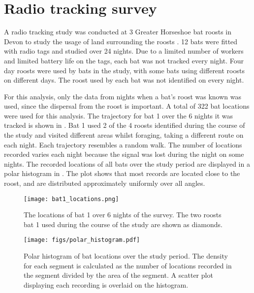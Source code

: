 
\section{Radio tracking survey} \label{sect:radiotrack}

A radio tracking study was conducted at 3 Greater Horseshoe bat roosts in Devon to
study the usage of land surrounding the roosts \cite{Mathews2009}. 12 bats were fitted with
radio tags and studied over 24 nights. Due to a limited number of workers and
 limited battery life on the tags, each bat was not tracked every night. Four day
 roosts were used by bats in the study, with some bats using different roosts on
 different days. The roost used by each bat was not identified on every night.

 For this analysis, only the
data from nights when a bat's roost was known was used, since the dispersal
from the roost is important.
A total of 322 bat locations were used for this analysis. The trajectory for bat
1 over the 6 nights it was tracked is shown in . Bat 1 used 2 of the 4 roosts identified during the course of the study and visited different areas whilst foraging, taking a different route on each night. Each trajectory resembles a random walk. The number of
locations recorded varies each night because the signal was lost during the night
 on some nights. The recorded locations of all bats over the study period are displayed in a polar histogram in . The plot shows that most records are located close to the roost, and are distributed approximately uniformly over all angles.

\begin{figure} [h]
    \centering
        \texttt{[image: bat1\_locations.png]}
        \caption{The locations of bat 1 over 6 nights of the survey. The two roosts bat 1 used during the course of the study are shown as diamonds.}
    \label{fig:bat1}
\end{figure}

\begin{figure}
\centering
    \texttt{[image: figs/polar\_histogram.pdf]}
    \caption{Polar histogram of bat locations over the study period. The density for each segment is calculated as the number of locations recorded in the segment divided by the area of the segment. A scatter plot displaying each recording is overlaid on the histogram.}
\label{fig:polar_histogram}
\end{figure}

